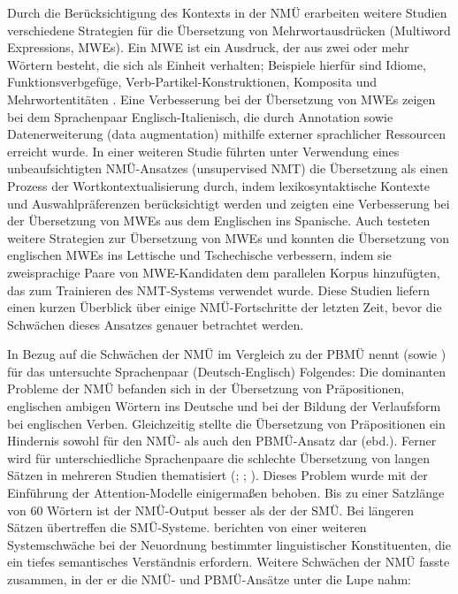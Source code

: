 Durch die Berücksichtigung des Kontexts in der NMÜ erarbeiten weitere Studien verschiedene Strategien für die Übersetzung von Mehrwortausdrücken (Multiword Expressions, MWEs). Ein MWE ist ein Ausdruck, der aus zwei oder mehr Wörtern besteht, die sich als Einheit verhalten; Beispiele hierfür sind Idiome, Funktionsverbgefüge, Verb-Partikel-Konstruktionen, Komposita und Mehrwort\-entitäten \citep{ConstantEtAl2017}. Eine Verbesserung bei der Übersetzung von MWEs zeigen \citet{ZaninelloBirch2020} bei dem Sprachenpaar Englisch-Italienisch, die durch Annotation sowie Datenerweiterung (data augmentation) mithilfe externer sprachlicher Ressourcen erreicht wurde. In einer weiteren Studie führten \citet{GamalloGarcia2019} unter Verwendung eines unbeaufsichtigten NMÜ-Ansat\-zes (unsupervised NMT) die Übersetzung als einen Prozess der Wortkontextualisierung durch, indem lexikosyntaktische Kontexte und Auswahlpräferenzen berücksichtigt werden und zeigten eine Verbesserung bei der Übersetzung von MWEs aus dem Englischen ins Spanische. Auch \citet{RiktersBojar2019} testeten weitere Strategien zur Übersetzung von MWEs und konnten die Übersetzung von englischen MWEs ins Lettische und Tschechische verbessern, indem sie zweisprachige Paare von MWE-Kandidaten dem parallelen Korpus hinzufügten, das zum Trainieren des NMT-Systems verwendet wurde. Diese Studien liefern einen kurzen Überblick über einige NMÜ-Fortschritte der letzten Zeit, bevor die Schwächen dieses Ansatzes genauer betrachtet werden.

In Bezug auf die Schwächen der NMÜ im Vergleich zu der PBMÜ nennt \citet{Popović2017} (sowie \citealt{Popović2018}) für das untersuchte Sprachenpaar (Deutsch-Englisch) Folgendes: Die dominanten Probleme der NMÜ befanden sich in der Übersetzung von Präpositionen, englischen ambigen Wörtern ins Deutsche und bei der Bildung der Verlaufsform bei englischen Verben. Gleichzeitig stellte die Übersetzung von Präpositionen ein Hindernis sowohl für den NMÜ- als auch den PBMÜ-Ansatz dar (ebd.). Ferner wird für unterschiedliche Sprachenpaare die schlechte Übersetzung von langen Sätzen in mehreren Studien thematisiert (\citealt{BentivogliEtAl2016}; \citealt{Köhn2017}; \citealt{ToralSanchez-Cartagena2017}). Dieses Problem wurde mit der Einführung der Attention-Modelle einigermaßen behoben. Bis zu einer Satzlänge von 60 Wörtern ist der NMÜ-Output besser als der der SMÜ. Bei längeren Sätzen übertreffen die SMÜ-Systeme. \citep{Köhn2017} \citet{BentivogliEtAl2016} berichten von einer weiteren Systemschwäche bei der Neuordnung bestimmter linguistischer Konstituenten, die ein tiefes semantisches Verständnis erfordern. Weitere Schwächen der NMÜ fasste \citet{Köhn2017} zusammen, in der er die NMÜ- und PBMÜ-Ansätze unter die Lupe nahm:


